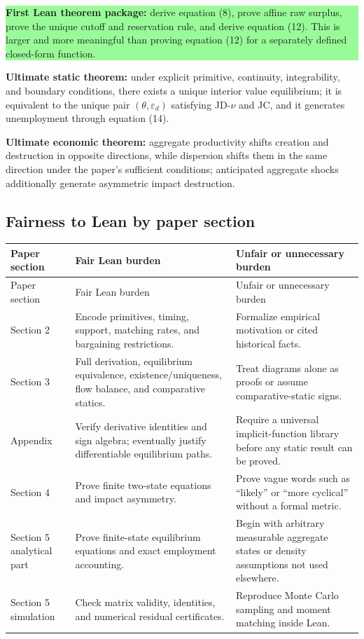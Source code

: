 \documentclass[11pt]{article}
\newcommand{\epsd}{\varepsilon_d}
\newcommand{\statusbox}[2]{\vspace{2pt}\noindent\colorbox{#1}{\parbox{0.955\linewidth}{\small #2}}\vspace{2pt}}
\begin{document}
\statusbox{paleGreen}{\textbf{First Lean theorem package:} derive equation (8), prove affine raw surplus, prove the unique cutoff and reservation rule, and derive equation (12). This is larger and more meaningful than proving equation (12) for a separately defined closed-form function.}

\statusbox{paleBlue}{\textbf{Ultimate static theorem:} under explicit primitive, continuity, integrability, and boundary conditions, there exists a unique interior value equilibrium; it is equivalent to the unique pair $(\theta,\epsd)$ satisfying JD-$\nu$ and JC, and it generates unemployment through equation (14).}

\statusbox{paleAmber}{\textbf{Ultimate economic theorem:} aggregate productivity shifts creation and destruction in opposite directions, while dispersion shifts them in the same direction under the paper's sufficient conditions; anticipated aggregate shocks additionally generate asymmetric impact destruction.}

\subsection{Fairness to Lean by paper section}

\begin{longtable}{>{\raggedright\arraybackslash}p{} >{\raggedright\arraybackslash}p{} >{\raggedright\arraybackslash}p{}}
\toprule
Paper section & Fair Lean burden & Unfair or unnecessary burden \\
\midrule
\endfirsthead
\toprule
Paper section & Fair Lean burden & Unfair or unnecessary burden \\
\midrule
\endhead
Section 2 & Encode primitives, timing, support, matching rates, and bargaining restrictions. & Formalize empirical motivation or cited historical facts. \\
Section 3 & Full derivation, equilibrium equivalence, existence/uniqueness, flow balance, and comparative statics. & Treat diagrams alone as proofs or assume comparative-static signs. \\
Appendix & Verify derivative identities and sign algebra; eventually justify differentiable equilibrium paths. & Require a universal implicit-function library before any static result can be proved. \\
Section 4 & Prove finite two-state equations and impact asymmetry. & Prove vague words such as ``likely'' or ``more cyclical'' without a formal metric. \\
Section 5 analytical part & Prove finite-state equilibrium equations and exact employment accounting. & Begin with arbitrary measurable aggregate states or density assumptions not used elsewhere. \\
Section 5 simulation & Check matrix validity, identities, and numerical residual certificates. & Reproduce Monte Carlo sampling and moment matching inside Lean. \\
\bottomrule
\end{longtable}
\end{document}
